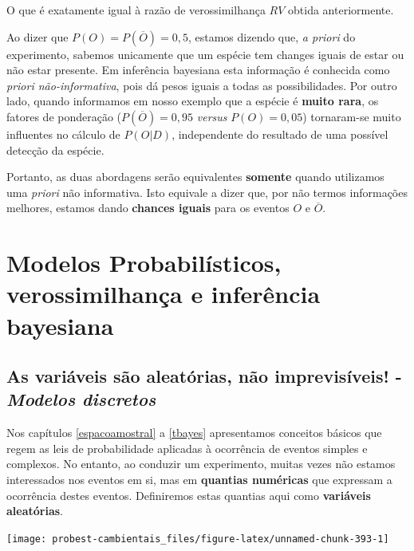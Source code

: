 \documentclass[
]{book}
\begin{document}
O que é exatamente igual à razão de verossimilhança \(RV\) obtida anteriormente.

Ao dizer que \(P(O) = P(\overline{O}) = 0,5\), estamos dizendo que, \emph{a priori} do experimento, sabemos unicamente que um espécie tem changes iguais de estar ou não estar presente. Em inferência bayesiana esta informação é conhecida como \emph{priori não-informativa}, pois dá pesos iguais a todas as possibilidades. Por outro lado, quando informamos em nosso exemplo que a espécie é \textbf{muito rara}, os fatores de ponderação (\(P(\overline{O}) = 0,95\) \emph{versus} \(P(O) = 0,05\)) tornaram-se muito influentes no cálculo de \(P(O|D)\), independente do resultado de uma possível detecção da espécie.

Portanto, as duas abordagens serão equivalentes \textbf{somente} quando utilizamos uma \emph{priori} não informativa. Isto equivale a dizer que, por não termos informações melhores, estamos dando \textbf{chances iguais} para os eventos \(O\) e \(\overline{O}\).

\hypertarget{part-modelos-probabiluxedsticos-verossimilhanuxe7a-e-inferuxeancia-bayesiana}{%
\part{Modelos Probabilísticos, verossimilhança e inferência bayesiana}\label{part-modelos-probabiluxedsticos-verossimilhanuxe7a-e-inferuxeancia-bayesiana}}

\hypertarget{va}{%
\chapter{\texorpdfstring{As variáveis são aleatórias, não imprevisíveis! - \emph{Modelos discretos}}{As variáveis são aleatórias, não imprevisíveis! - Modelos discretos}}\label{va}}

Nos capítulos \ref{espacoamostral} a \ref{tbayes} apresentamos conceitos básicos que regem as leis de probabilidade aplicadas à ocorrência de eventos simples e complexos. No entanto, ao conduzir um experimento, muitas vezes não estamos interessados nos eventos em si, mas em \textbf{quantias numéricas} que expressam a ocorrência destes eventos. Definiremos estas quantias aqui como \textbf{variáveis aleatórias}.

\begin{center}\texttt{[image: probest-cambientais\_files/figure-latex/unnamed-chunk-393-1]} \end{center}
\end{document}
